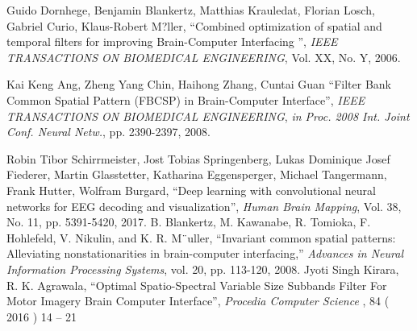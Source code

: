 \documentclass[a4paper,11pt,oneside,openany, report]{jsbook}
\begin{document}
\begin{thebibliography}{99}
   Guido Dornhege, Benjamin Blankertz, Matthias Krauledat, Florian Losch, Gabriel Curio, Klaus-Robert M?ller,
      ``Combined optimization of spatial and temporal
      filters for improving Brain-Computer Interfacing
      '',
      {\it IEEE TRANSACTIONS ON BIOMEDICAL ENGINEERING},
      Vol. XX,
      No. Y,
      2006.

   Kai Keng Ang, Zheng Yang Chin, Haihong Zhang, Cuntai Guan
      ``Filter Bank Common Spatial Pattern (FBCSP) in Brain-Computer Interface'',
      {\it IEEE TRANSACTIONS ON BIOMEDICAL ENGINEERING},
      {\it in Proc. 2008 Int. Joint Conf. Neural Netw.},
      pp. 2390-2397,
      2008.

   Robin Tibor Schirrmeister,
      Jost Tobias Springenberg,
      Lukas Dominique Josef Fiederer,
      Martin Glasstetter,
      Katharina Eggensperger,
      Michael Tangermann,
      Frank Hutter,
      Wolfram Burgard,
      ``Deep learning with convolutional neural networks for EEG decoding and visualization'',
      {\it Human Brain Mapping},
      Vol. 38,
      No. 11,
      pp. 5391-5420,
      2017.
   B. Blankertz, M. Kawanabe, R. Tomioka, F. Hohlefeld, V. Nikulin, 
        and K. R. M¨uller, “Invariant common spatial patterns: Alleviating
        nonstationarities in brain-computer interfacing,” {\it Advances in
        Neural Information Processing Systems}, vol. 20, pp. 113-120, 2008.
   Jyoti Singh Kirara, R. K. Agrawala, 
      ``Optimal Spatio-Spectral Variable Size Subbands Filter For Motor
      Imagery Brain Computer Interface'',
      {\it  Procedia Computer Science },
      84 ( 2016 ) 14 – 21
\end{thebibliography}
%
%
% 
%
%
\newpage
\printindex
%
%
\end{document}
